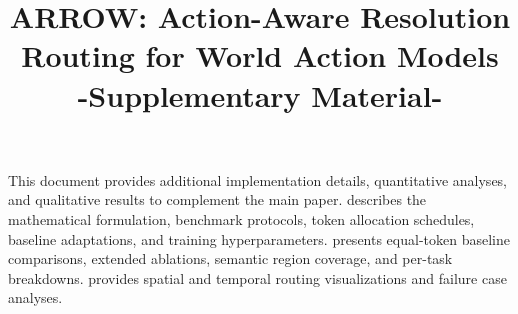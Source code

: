 \documentclass[10pt,twocolumn,letterpaper]{article}
\title{ARROW: Action-Aware Resolution Routing for World Action Models \\
-Supplementary Material-} %
\begin{document}
\maketitle
\appendix

\makeatletter
\renewcommand{\theequation}{\Alph{section}.\arabic{equation}}
\renewcommand{\thetable}{\Alph{section}.\arabic{table}}
\renewcommand{\thefigure}{\Alph{section}.\arabic{figure}}
\renewcommand{\thealgorithm}{\Alph{section}.\arabic{algorithm}}
\makeatother

    This document provides additional implementation details, quantitative analyses, and qualitative results to complement the main paper.
     describes the mathematical formulation, benchmark protocols, token allocation schedules, baseline adaptations, and training hyperparameters.
     presents equal-token baseline comparisons, extended ablations, semantic region coverage, and per-task breakdowns.
     provides spatial and temporal routing visualizations and failure case analyses.









{
    \small

    
    
}

\end{document}
